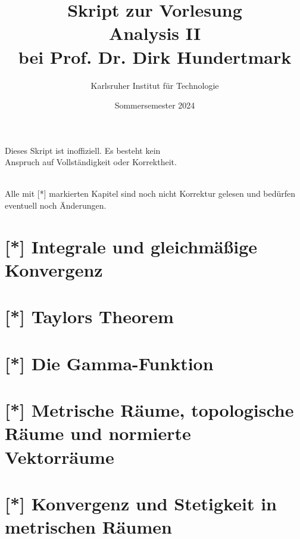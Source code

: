 \documentclass[11pt, twoside, a4paper]{article}
\theoremstyle{plain}
\numberwithin{equation}{subsection}
\begin{document}
    \title{\vspace{3cm} Skript zur Vorlesung\\Analysis II\\bei Prof. Dr. Dirk Hundertmark}
    \author{Karlsruher Institut für Technologie}
    \date{Sommersemester 2024}
    \maketitle
    \begin{center}
        Dieses Skript ist inoffiziell. Es besteht kein\\Anspruch auf Vollständigkeit oder Korrektheit.
    \end{center}
    \thispagestyle{empty}
    \newpage

    \tableofcontents
    ~\\
    Alle mit [*] markierten Kapitel sind noch nicht Korrektur gelesen und bedürfen eventuell noch Änderungen.

    \newpage

    
    
    
    


    \section{[*] Integrale und gleichmäßige Konvergenz}
    


    \section{[*] Taylors Theorem}
    


    \section{[*] Die Gamma-Funktion}
    


    \section{[*] Metrische Räume, topologische Räume und normierte Vektorräume}
    


    \section{[*] Konvergenz und Stetigkeit in metrischen Räumen}
    
\end{document}
